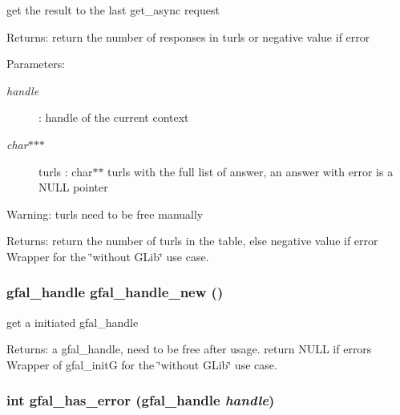 get the result to the last get\_\-async request \begin{Desc}
\item[Returns:]return the number of responses in turls or negative value if error \end{Desc}
\begin{Desc}
\item[Parameters:]
\begin{description}
\item[{\em handle}]: handle of the current context \item[{\em char$\ast$$\ast$$\ast$}]turls : char$\ast$$\ast$ turls with the full list of answer, an answer with error is a NULL pointer \end{description}
\end{Desc}
\begin{Desc}
\item[Warning:]turls need to be free manually \end{Desc}
\begin{Desc}
\item[Returns:]return the number of turls in the table, else negative value if error Wrapper for the \char`\"{}without GLib\char`\"{} use case. \end{Desc}
\subsubsection{\setlength{\rightskip}{0pt plus 5cm}gfal\_\-handle gfal\_\-handle\_\-new ()}\label{gfal__common__interface_8h_4211faf02a3c5cc696c7c9f974415d11}


get a initiated gfal\_\-handle 

\begin{Desc}
\item[Returns:]a gfal\_\-handle, need to be free after usage. return NULL if errors Wrapper of gfal\_\-init\-G for the \char`\"{}without GLib\char`\"{} use case. \end{Desc}
\subsubsection{\setlength{\rightskip}{0pt plus 5cm}int gfal\_\-has\_\-error (gfal\_\-handle {\em handle})}\label{gfal__common__interface_8h_ad28f1c5d1a0ed623834e6133bb7dd2e}


